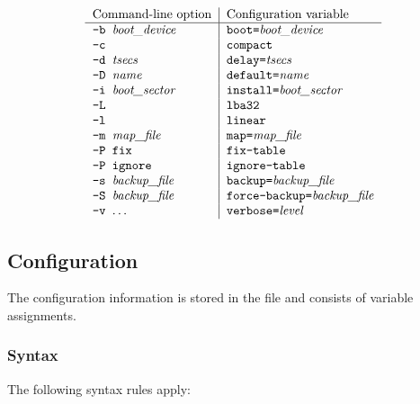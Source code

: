 $$
\begin{tabular}{l|l}
  Command-line option		& Configuration variable \\
  \hline
  \raw{-b \meta{boot\_device}}	& \raw{boot=\meta{boot\_device}} \\
  \raw{-c}			& \raw{compact} \\
  \raw{-d \meta{tsecs}}		& \raw{delay=\meta{tsecs}} \\
  \raw{-D \meta{name}}		& \raw{default=\meta{name}} \\
  \raw{-i \meta{boot\_sector}}	& \raw{install=\meta{boot\_sector}} \\
  \raw{-L}			& \raw{lba32} \\
  \raw{-l}			& \raw{linear} \\
  \raw{-m \meta{map\_file}}	& \raw{map=\meta{map\_file}} \\
  \raw{-P fix}			& \raw{fix-table} \\
  \raw{-P ignore}		& \raw{ignore-table} \\
  \raw{-s \meta{backup\_file}}	& \raw{backup=\meta{backup\_file}} \\
  \raw{-S \meta{backup\_file}}	& \raw{force-backup=\meta{backup\_file}} \\
  \raw{-v $\ldots$}		& \raw{verbose=\meta{level}} \\
\end{tabular}
$$


\subsection{Configuration}
\label{config}

The configuration information is stored in the file 
and consists of variable assignments.


\subsubsection{Syntax}
\label{syntax}

The following syntax rules apply:

